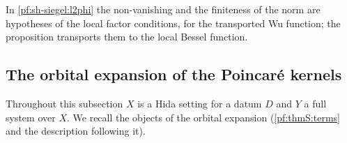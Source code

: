 \begin{remark}
In \cref{pf:sh-siegel:l2phi} the non-vanishing and the finiteness of the norm are hypotheses of the local factor
conditions, for the transported Wu function; the proposition transports them to the local Bessel function.
\end{remark}


\subsection{The orbital expansion of the Poincar\'e kernels}\label{sec:pf:sh-siegel:orb}

Throughout this subsection $X$ is a Hida setting for a datum $D$ and $Y$ a full system over $X$. We recall the objects of
the orbital expansion (\cref{pf:thmS:terms} and the description following it).

